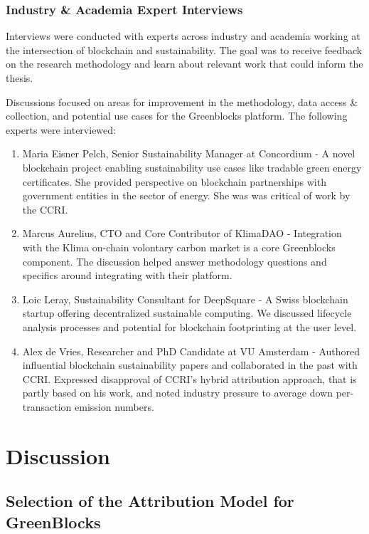 \documentclass[11pt]{report}
\begin{document}
\subsection{Industry \& Academia Expert Interviews}

Interviews were conducted with experts across industry and academia working at the intersection of blockchain and sustainability. The goal was to receive feedback on the research methodology and learn about relevant work that could inform the thesis.

Discussions focused on areas for improvement in the methodology, data access \& collection, and potential use cases for the Greenblocks platform. The following experts were interviewed:

\begin{enumerate}
    \item Maria Eisner Pelch, Senior Sustainability Manager at Concordium - A novel blockchain project enabling sustainability use cases like tradable green energy certificates. She provided perspective on blockchain partnerships with government entities in the sector of energy. She was was critical of work by the CCRI.
    \item Marcus Aurelius, CTO and Core Contributor of KlimaDAO - Integration with the Klima on-chain volontary carbon market is a core Greenblocks component. The discussion helped answer methodology questions and specifics around integrating with their platform.
    \item Loic Leray, Sustainability Consultant for DeepSquare - A Swiss blockchain startup offering decentralized sustainable computing. We discussed lifecycle analysis processes and potential for blockchain footprinting at the user level.
    \item Alex de Vries, Researcher and PhD Candidate at VU Amsterdam - Authored influential blockchain sustainability papers and collaborated in the past with CCRI. Expressed disapproval of CCRI's hybrid attribution approach, that is partly based on his work, and noted industry pressure to average down per-transaction emission numbers.
\end{enumerate}


\chapter{Discussion}

\section{Selection of the Attribution Model for GreenBlocks}
\end{document}
